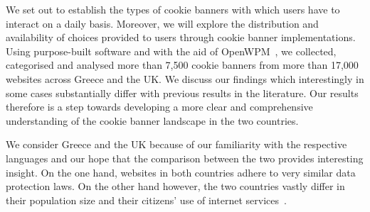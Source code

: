 We set out to establish the types of cookie banners with which users have to interact  on a daily basis. 
Moreover, we will explore the distribution and availability of choices provided to users through cookie banner implementations. 
Using purpose-built software and with the aid of OpenWPM~\cite{englehardt2016census}, we collected, categorised and analysed more than 7,500 cookie banners from more than 17,000 websites across Greece and the UK. We discuss our findings which interestingly in some cases substantially differ with previous results in the literature. Our results therefore is a step towards developing a more clear and comprehensive understanding of the cookie banner landscape in the two countries. 

We consider Greece and the UK because of our familiarity with the respective languages and our hope that the comparison between the two provides interesting insight. On the one hand, websites in both countries adhere to very similar data protection laws. On the other hand however, the two countries vastly differ in their population size and their citizens' use of internet services~\cite{desi-report-2020}. 
